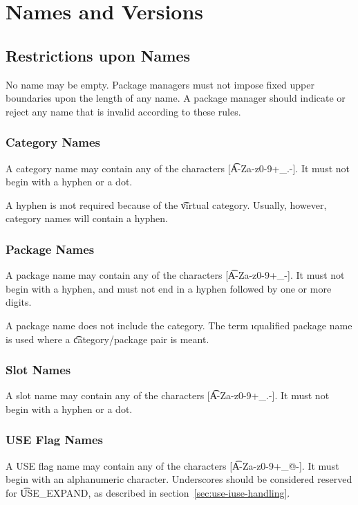 \chapter{Names and Versions}

\section{Restrictions upon Names}

No name may be empty. Package managers must not impose fixed upper boundaries upon the length of any
name. A package manager should indicate or reject any name that is invalid according to these rules.

\subsection{Category Names}
A category name may contain any of the characters [\t{A-Za-z0-9+\_.-}]. It must not begin with
a hyphen or a dot.

\note A hyphen is \i{not} required because of the \t{virtual} category. Usually, however, category
names will contain a hyphen.

\subsection{Package Names}
A package name may contain any of the characters [\t{A-Za-z0-9+\_-}]. It must not begin with a
hyphen, and must not end in a hyphen followed by one or more digits.

\note A package name does not include the category. The term \i{qualified package name} is used
where a \t{category/package} pair is meant.

\subsection{Slot Names}
\label{sec:slot-names}
A slot name may contain any of the characters [\t{A-Za-z0-9+\_.-}]. It must not begin with a
hyphen or a dot.

\subsection{USE Flag Names}
A USE flag name may contain any of the characters [\t{A-Za-z0-9+\_@-}]. It must begin with an
alphanumeric character. Underscores should be considered reserved for \t{USE\_EXPAND}, as
described in section~\ref{sec:use-iuse-handling}.

